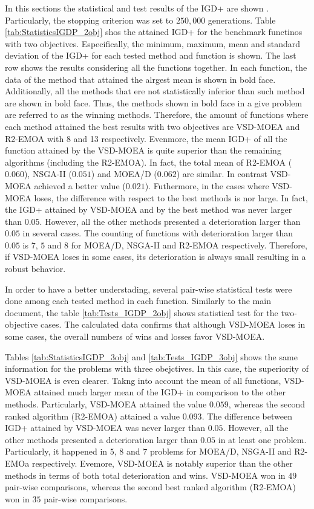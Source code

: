 In this sections the statistical and test results of the IGD+ are shown \cite{Joel:Inverted_Generational_Distance_Plus}.
%
Particularly, the stopping criterion was set to $250,000$ generations.
%
Table \ref{tab:StatisticsIGDP_2obj} shos the attained IGD+ for the benchmark functinos with two objectives.
%
Especifically, the minimum, maximum, mean and standard deviation of the IGD+ for each tested method and function is shown.
%
The last row shows the results considering all the functions together.
%
In each function, the data of the method that attained the alrgest mean is shown in bold face.
%
Additionally, all the methods that ere not statistically inferior than such method are shown in bold face.
%
Thus, the methods shown in bold face in a give problem are referred to as the winning methods.
%
Therefore, the amount of functions where each method attained the best results with two objectives are VSD-MOEA and R2-EMOA with 8 and 13 respectively.
%
Evenmore, the mean IGD+ of all the function attained by the VSD-MOEA is quite superior than the remaining algorithms (including the R2-EMOA).
%
In fact, the total mean of R2-EMOA ($0.060$), NSGA-II ($0.051$) and MOEA/D ($0.062$) are similar.
%
In contrast VSD-MOEA achieved a better value ($0.021$).
%
Futhermore, in the cases where VSD-MOEA loses, the difference with respect to the best methods is nor large.
%
In fact, the IGD+ attained by VSD-MOEA and by the best method was never larger than $0.05$.
%
However, all the other methods presented a deterioration larger than $0.05$ in several cases.
%
The counting of functions with deterioration larger than $0.05$ is $7$, $5$ and $8$ for MOEA/D, NSGA-II and R2-EMOA respectively.
%
Therefore, if VSD-MOEA loses in some cases, its deterioration is always small resulting in a robust behavior.

In order to have a better understading, several pair-wise statistical tests were done among each tested method in each function.
%
Similarly to the main document, the table \ref{tab:Tests_IGDP_2obj} shows statistical test for the two-objective cases.
%
The calculated data confirms that although VSD-MOEA loses in some cases, the overall numbers of wins and losses favor VSD-MOEA.
%

Tables \ref{tab:StatisticsIGDP_3obj} and \ref{tab:Tests_IGDP_3obj} shows the same information for the problems with three obejctives.
%
In this case, the superiority of VSD-MOEA is even clearer.
%
Takng into account the mean of all functions, VSD-MOEA attained much larger mean of the IGD+ in comparison to the other methods.
%
Particularly, VSD-MOEA attained the value $0.059$, whereas the second ranked algorithm (R2-EMOA) attained a value $0.093$.
%
The difference between IGD+ attained by VSD-MOEA was never larger than $0.05$.
%
However, all the other methods presented a deterioration larger than $0.05$ in at least one problem.
%
Particularly, it happened in $5$, $8$ and $7$ problems for MOEA/D, NSGA-II and R2-EMOa respectively.
%
Evemore, VSD-MOEA is notably superior than the other methods in terms of both total deterioration and wins.
%
VSD-MOEA won in $49$ pair-wise comparisons, whereas the second best ranked algorithm (R2-EMOA) won in $35$ pair-wise comparisons.







